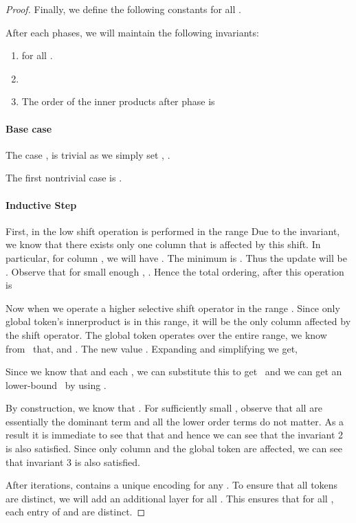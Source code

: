 \documentclass{article}
\begin{document}
\begin{proof}
    Finally, we define the following constants for all . 
     
    
    
    After each  phases, we will maintain the following invariants:
    \begin{enumerate}
    \item   for all . 
    \item  
    \item  The order of the inner products after  phase is 
      
    \end{enumerate}
    
    
    \paragraph{Base case}    
    The case , is trivial as we simply set  , . 
    
    The first nontrivial case is . 

   \paragraph{ Inductive Step }
   First, in the low shift operation is performed in the range 
   Due to the invariant, we know that there exists only one column  that is affected by this shift. 
   In particular, for column , we will have . The minimum is . Thus the update will be
   .  Observe that for small enough ,
   .  Hence the total ordering, after this operation is

Now when we operate a higher selective shift operator in the range .  
    Since only global token's innerproduct   is in this range, 
    it will be the only column affected by the shift operator. The global token operates  over the entire range, we know from~ that,   and . 
    The new value . 
    Expanding and simplifying we get,  
    
         
    Since we know that  and each , we can substitute this to get~
    and we can get an lower-bound~ by using . 
    
    By construction, we know that .  For sufficiently small , 
    observe that  all are essentially the dominant term  and all the lower order terms do not matter.  As a result it is 
    immediate to see that that  and hence we
    can see that the invariant 2 is also satisfied. Since only column  and the global token are affected,
    we can see that invariant 3 is also satisfied. 
    
    After  iterations,  contains a unique encoding for any . 
    To ensure that all tokens are distinct, we will add an additional layer 
     for all . 
    This ensures that for all , each entry of  and  are distinct. 
\end{proof}
\end{document}
